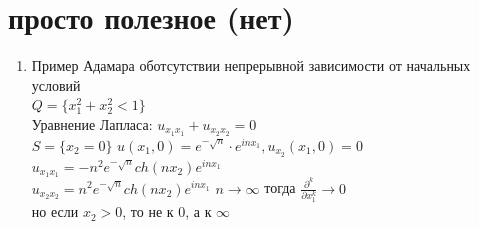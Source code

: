 \documentclass[a4paper,12pt]{article}
\newcommand {\pp} {\partial}
\begin{document}
\section{просто полезное (нет)}
\begin{enumerate}

\item Пример Адамара оботсутствии непрерывной зависимости от начальных условий\\
$Q = \{x_1^2 + x_2^2 < 1\}$\\
Уравнение Лапласа: $u_{x_1x_1} + u_{x_2x_2} = 0$\\
$S = \{x_2 = 0\}$
$u(x_1,0) = e^{-\sqrt{n}} \cdot e^{inx_1}, u_{x_2}(x_1,0) = 0$\\
$u_{x_1x_1} = -n^2 e^{-\sqrt{n}}ch(nx_2) e^{inx_1}$\\
$u_{x_2x_2} = n^2 e^{-\sqrt{n}}ch(nx_2) e^{inx_1}$
$n\to \infty$ тогда $\frac{\pp^k}{\pp x_1^k}\to 0$\\
но если $x_2 > 0$, то не к 0, а к $\infty$


\end{enumerate}
\end{document}
